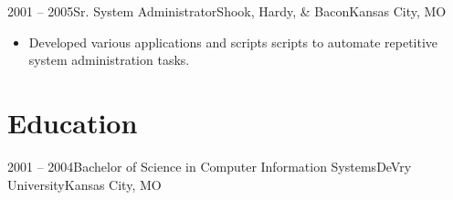 \documentclass[11pt,letterpaper,final]{moderncv}
\begin{document}
	\cventry
{2001 -- 2005}{Sr. System Administrator}{Shook, Hardy, \& Bacon}{Kansas City, MO}{}{
		\begin{itemize}
			\item
				Developed various applications and scripts scripts to
				automate repetitive system administration tasks.
		\end{itemize}
	}

\section{Education} 
	\cventry
{2001 -- 2004}{Bachelor of Science in Computer Information Systems}{DeVry University}{Kansas City, MO}{}{}
\end{document}
